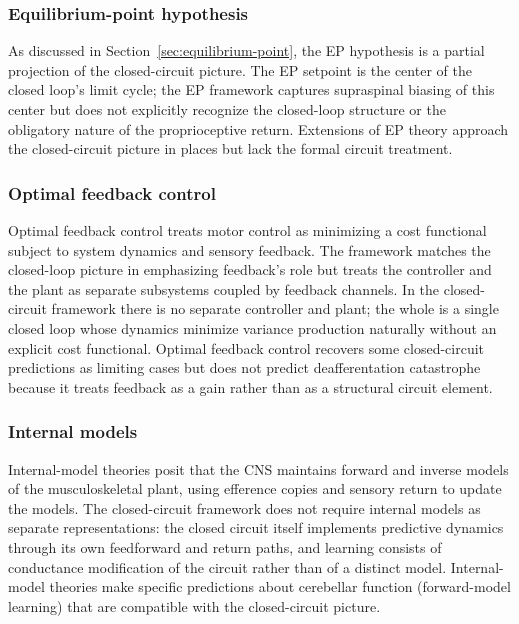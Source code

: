 \documentclass[11pt,twocolumn,a4paper]{article}
\theoremstyle{definition}
\theoremstyle{remark}
\begin{document}
\subsubsection{Equilibrium-point hypothesis}

As discussed in Section~\ref{sec:equilibrium-point}, the EP hypothesis
\citep{feldman1986,bizzi1992} is a partial projection of the
closed-circuit picture. The EP setpoint is the center of the closed
loop's limit cycle; the EP framework captures supraspinal biasing of
this center but does not explicitly recognize the closed-loop
structure or the obligatory nature of the proprioceptive return.
Extensions of EP theory \citep{latash2010,feldman2015} approach the
closed-circuit picture in places but lack the formal circuit treatment.

\subsubsection{Optimal feedback control}

Optimal feedback control \citep{todorov2002,scott2004} treats motor
control as minimizing a cost functional subject to system dynamics and
sensory feedback. The framework matches the closed-loop picture in
emphasizing feedback's role but treats the controller and the plant
as separate subsystems coupled by feedback channels. In the
closed-circuit framework there is no separate controller and plant;
the whole is a single closed loop whose dynamics minimize variance
production naturally without an explicit cost functional. Optimal
feedback control recovers some closed-circuit predictions as limiting
cases but does not predict deafferentation catastrophe because it
treats feedback as a gain rather than as a structural circuit
element.

\subsubsection{Internal models}

Internal-model theories \citep{kawato1999,wolpert2000,shadmehr2008}
posit that the CNS maintains forward and inverse models of the
musculoskeletal plant, using efference copies and sensory return to
update the models. The closed-circuit framework does not require
internal models as separate representations: the closed circuit itself
implements predictive dynamics through its own feedforward and return
paths, and learning consists of conductance modification of the circuit
rather than of a distinct model. Internal-model theories make specific
predictions about cerebellar function (forward-model learning) that
are compatible with the closed-circuit picture.
\end{document}

